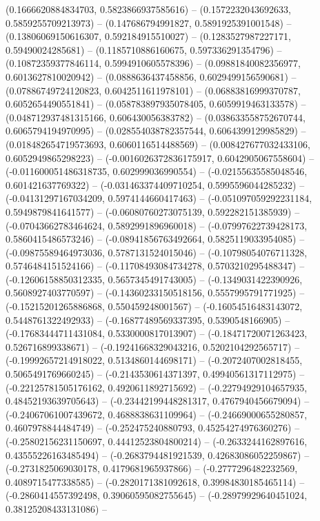 \begin{scope}[blend group = overlay]
(0.1666620884834703, 0.5823866937585616) -- 
(0.1572232043692633, 0.5859255709213973) -- 
(0.147686794991827, 0.5891925391001548) -- 
(0.13806069150616307, 0.592184915510027) -- 
(0.1283527987227171, 0.59490024285681) -- 
(0.1185710886160675, 0.597336291354796) -- 
(0.10872359377846114, 0.5994910605578396) -- 
(0.09881840082356977, 0.6013627810020942) -- 
(0.0888636437458856, 0.6029499156590681) -- 
(0.07886749724120823, 0.6042511611978101) -- 
(0.06883816999370787, 0.6052654490551841) -- 
(0.058783897935078405, 0.6059919463133578) -- 
(0.048712937481315166, 0.606430056383782) -- 
(0.038633558752670744, 0.6065794194970995) -- 
(0.028554038782357544, 0.6064399129985829) -- 
(0.018482654719573693, 0.6060116514488569) -- 
(0.008427677032433106, 0.6052949865298223) -- 
(-0.0016026372836175917, 0.6042905067558604) -- 
(-0.011600051486318735, 0.602999036990554) -- 
(-0.02155635585048546, 0.601421637769322) -- 
(-0.031463374409710254, 0.5995596044285232) -- 
(-0.04131297167034209, 0.5974144660417463) -- 
(-0.051097059292231184, 0.5949879841641577) -- 
(-0.06080760273075139, 0.592282151385939) -- 
(-0.07043662783464624, 0.5892991896960018) -- 
(-0.07997622739428173, 0.5860415486573246) -- 
(-0.08941856763492664, 0.5825119033954085) -- 
(-0.09875589464973036, 0.5787131524015046) -- 
(-0.10798054076711328, 0.5746484151524166) -- 
(-0.11708493084734278, 0.5703210295488347) -- 
(-0.12606158850312335, 0.5657345491743005) -- 
(-0.1349031422390926, 0.5608927403770597) -- 
(-0.14360233150518156, 0.5557995791771925) -- 
(-0.15215201265886868, 0.550459248001567) -- 
(-0.16054516483143072, 0.5448761322492933) -- 
(-0.16877489569337395, 0.5390548166905) -- 
(-0.17683444711431084, 0.5330000817013907) -- 
(-0.18471720071263423, 0.526716899338671) -- 
(-0.19241668329043216, 0.5202104292565717) -- 
(-0.19992657214918022, 0.5134860144698171) -- 
(-0.2072407002818455, 0.5065491769660245) -- 
(-0.2143530614371397, 0.49940561317112975) -- 
(-0.22125781505176162, 0.4920611892715692) -- 
(-0.22794929104657935, 0.48452193639705643) -- 
(-0.23442199448281317, 0.4767940456679094) -- 
(-0.24067061007439672, 0.4688838631109964) -- 
(-0.24669000655280857, 0.4607978844484749) -- 
(-0.252475240880793, 0.45254274976360276) -- 
(-0.25802156231150697, 0.44412523804800214) -- 
(-0.2633244162897616, 0.43555226163485494) -- 
(-0.2683794481921539, 0.42683086052259867) -- 
(-0.2731825069030178, 0.4179681965937866) -- 
(-0.2777296482232569, 0.4089715477338585) -- 
(-0.2820171381092618, 0.39984830185465114) -- 
(-0.2860414557392498, 0.39060595082755645) -- 
(-0.28979929640451024, 0.38125208433131086) -- 

\end{scope}
